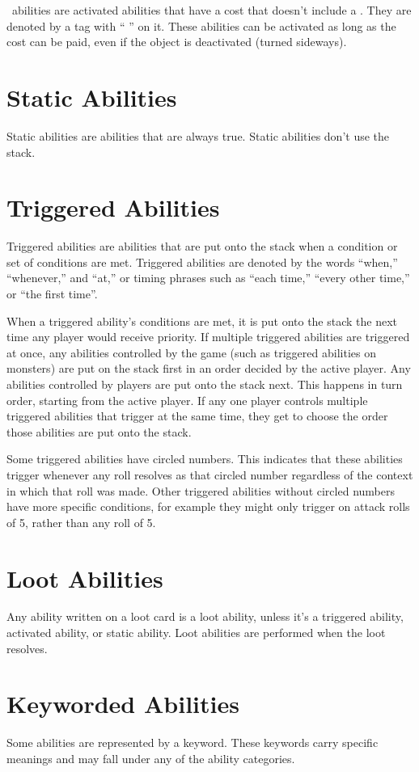 \documentclass[
  fontsize=10pt,
  paper=a5,
  version=last,
  chapterprefix=true,
  bindingoffset=5mm,
  ]{scrbook}
\newcommand*{\inlineicon}[1]{%
    \raisebox{-.3\baselineskip}{%
        \smash{%
            \texttt{[image: \#1]}%
        }%
    }%
}
\newcommand{\tap}{\inlineicon{./assets/ms-tap.png}}
\newcommand{\pay}{\inlineicon{./assets/ms-paid.png}}
\begin{document}
    \pay\ abilities are activated abilities that have a cost that doesn’t include a \tap. They are denoted by a tag with “\pay” on it. These abilities can be activated as long as the cost can be paid, even if the object is deactivated (turned sideways).

    \section{Static Abilities}
    Static abilities are abilities that are always true. Static abilities don’t use the stack.

    \section{Triggered Abilities}
    Triggered abilities are abilities that are put onto the stack when a condition or set of conditions are met. Triggered abilities are denoted by the words “when,” “whenever,” and “at,” or timing phrases such as “each time,” “every other time,” or “the first time”.

    When a triggered ability’s conditions are met, it is put onto the stack the next time any player would receive priority. If multiple triggered abilities are triggered at once, any abilities controlled by the game (such as triggered abilities on monsters) are put on the stack first in an order decided by the active player. Any abilities controlled by players are put onto the stack next. This happens in turn order, starting from the active player. If any one player controls multiple triggered abilities that trigger at the same time, they get to choose the order those abilities are put onto the stack.

    Some triggered abilities have circled numbers. This indicates that these abilities trigger whenever any roll resolves as that circled number regardless of the context in which that roll was made. Other triggered abilities without circled numbers have more specific conditions, for example they might only trigger on attack rolls of 5, rather than any roll of 5.

    \section{Loot Abilities}
    Any ability written on a loot card is a loot ability, unless it’s a triggered ability, activated ability, or static ability. Loot abilities are performed when the loot resolves.

    \section{Keyworded Abilities}
    \label{keyworded}
    Some abilities are represented by a keyword. These keywords carry specific meanings and may fall under any of the ability categories.
\end{document}
